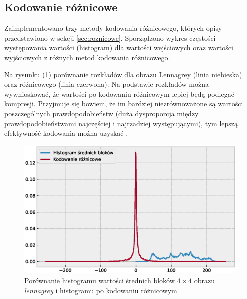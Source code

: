 \documentclass{article}
\begin{document}
\FloatBarrier

\subsection{Kodowanie różnicowe}

Zaimplementowano trzy metody kodowania różnicowego, których opisy przedstawiono w sekcji \ref{sec:roznicowe}.
Sporządzono wykres częstości występowania wartości (histogram) dla wartości wejściowych oraz wartości wyjściowych
z różnych metod kodowania różnicowego.

Na rysunku (\ref{fig:de_histogram_image}) porównanie rozkładów dla obrazu Lennagrey (linia niebieska) oraz różnicowego (linia czerwona).
Na podstawie rozkładów można wywnioskować, że wartości po kodowaniu różnicowym lepiej będą podlegać kompresji.
Przyjmuje się bowiem, że im bardziej niezrównoważone są wartości poszczególnych prawdopodobieństw (duża dysproporcja między prawdopodobieństwami najczęściej i najrzadziej występującymi), tym lepszą efektywność kodowania można uzyskać \cite{ulacha_roznicowe}.


\begin{figure}[H]
  \centering
  \includegraphics[width=.5\linewidth]{images/differential_encoding_histogram_image.eps}
  \caption{Porównanie histogramu wartości średnich bloków $4\times4$ obrazu \emph{lennagrey} i histogramu po kodowaniu różnicowym}
  \label{fig:de_histogram_image}
\end{figure}
\end{document}
